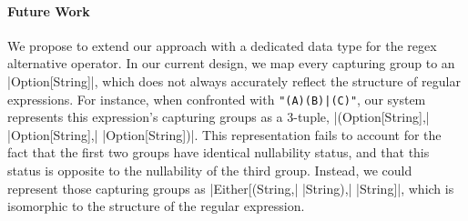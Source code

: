 \paragraph{Future Work}
We propose to extend our approach with a dedicated data type for the regex alternative operator.
In our current design, we map every capturing group to an |Option[String]|, which does not always accurately reflect the structure of regular expressions.
For instance, when confronted with \lstinline!"(A)(B)|(C)"!, our system represents this expression's capturing groups as a 3-tuple, |(Option[String],| |Option[String],| |Option[String])|. This representation fails to account for the fact that the first two groups have identical nullability status, and that this status is opposite to the nullability of the third group.
Instead, we could represent those capturing groups as |Either[(String,| |String),| |String]|, which is isomorphic to the structure of the regular expression.
